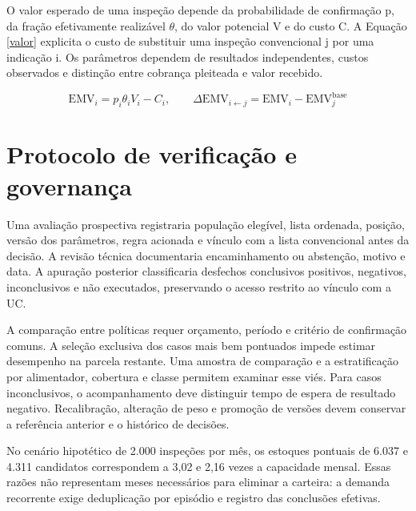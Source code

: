 O valor esperado de uma inspeção depende da probabilidade de confirmação p, da fração efetivamente realizável \ensuremath{\theta}, do valor potencial V e do custo C. A Equação \eqref{valor} explicita o custo de substituir uma inspeção convencional j por uma indicação i. Os parâmetros dependem de resultados independentes, custos observados e distinção entre cobrança pleiteada e valor recebido.

\begin{equation}\label{valor}
\mathrm{EMV}_i=p_i\theta_iV_i-C_i,\qquad \Delta\mathrm{EMV}_{i\leftarrow j}=\mathrm{EMV}_i-\mathrm{EMV}^{\mathrm{base}}_j
\end{equation}

\section{Protocolo de verificação e governança}
Uma avaliação prospectiva registraria população elegível, lista ordenada, posição, versão dos parâmetros, regra acionada e vínculo com a lista convencional antes da decisão. A revisão técnica documentaria encaminhamento ou abstenção, motivo e data. A apuração posterior classificaria desfechos conclusivos positivos, negativos, inconclusivos e não executados, preservando o acesso restrito ao vínculo com a UC.

A comparação entre políticas requer orçamento, período e critério de confirmação comuns. A seleção exclusiva dos casos mais bem pontuados impede estimar desempenho na parcela restante. Uma amostra de comparação e a estratificação por alimentador, cobertura e classe permitem examinar esse viés. Para casos inconclusivos, o acompanhamento deve distinguir tempo de espera de resultado negativo. Recalibração, alteração de peso e promoção de versões devem conservar a referência anterior e o histórico de decisões.


No cenário hipotético de 2.000 inspeções por mês, os estoques pontuais de 6.037 e 4.311 candidatos correspondem a 3,02 e 2,16 vezes a capacidade mensal. Essas razões não representam meses necessários para eliminar a carteira: a demanda recorrente exige deduplicação por episódio e registro das conclusões efetivas.
